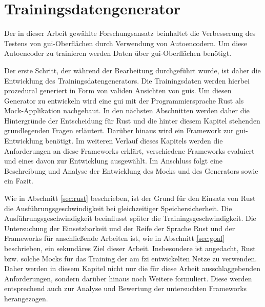 \chapter{Trainingsdatengenerator}
\label{cha:gui}
Der in dieser Arbeit gewählte Forschungsansatz beinhaltet die Verbesserung des Testens von \gls{gui}-Oberflächen durch Verwendung von Autoencodern. Um diese Autoencoder zu trainieren werden Daten über \gls{gui}-Oberflächen benötigt.

Der erste Schritt, der während der Bearbeitung durchgeführt wurde, ist daher die Entwicklung des Trainingsdatengenerators. Die Trainingsdaten werden hierbei prozedural generiert in Form von validen Ansichten von \glspl{gui}.
Um diesen Generator zu entwickeln wird eine \gls{gui} mit der Programmiersprache Rust als Mock-Applikation nachgebaut. In den nächsten Abschnitten werden daher die Hintergründe der Entscheidung für Rust und die hinter diesem Kapitel stehenden grundlegenden Fragen erläutert.
Darüber hinaus wird ein Framework zur \gls{gui}-Entwicklung benötigt. Im weiteren Verlauf dieses Kapitels werden die Anforderungen an diese Frameworks erklärt, verschiedene Frameworks evaluiert und eines davon zur Entwicklung ausgewählt. Im Anschluss folgt eine Beschreibung und Analyse der Entwicklung des Mocks und des Generators sowie ein Fazit.

Wie in Abschnitt \ref{sec:rust} beschrieben, ist der Grund für den Einsatz von Rust die Ausführungsgeschwindigkeit bei gleichzeitiger Speichersicherheit. Die Ausführungsgeschwindigkeit beeinflusst später die Trainingsgeschwindigkeit. Die Untersuchung der Einsetzbarkeit und der Reife der Sprache Rust und der Frameworks für anschließende Arbeiten ist, wie in Abschnitt \ref{sec:goal} beschrieben, ein sekundäres Ziel dieser Arbeit. Insbesondere ist angedacht, Rust bzw. solche Mocks für das Training der am \gls{fzi} entwickelten Netze zu verwenden. Daher werden in diesem Kapitel nicht nur die für diese Arbeit ausschlaggebenden Anforderungen, sondern darüber hinaus noch Weitere formuliert. Diese werden entsprechend auch zur Analyse und Bewertung der untersuchten Frameworks herangezogen.

